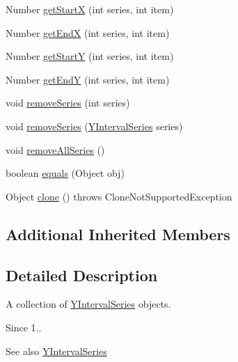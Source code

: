 \begin{DoxyCompactItemize}
\item 
Number \mbox{\hyperlink{classorg_1_1jfree_1_1data_1_1xy_1_1_y_interval_series_collection_a9675b5f0ee4eb7b9e0478844d2df61d0}{get\+StartX}} (int series, int item)
\item 
Number \mbox{\hyperlink{classorg_1_1jfree_1_1data_1_1xy_1_1_y_interval_series_collection_a5eed5a5a74285ab346d7bf3e19d31d58}{get\+EndX}} (int series, int item)
\item 
Number \mbox{\hyperlink{classorg_1_1jfree_1_1data_1_1xy_1_1_y_interval_series_collection_af499ea43862281841b964053bc9950dc}{get\+StartY}} (int series, int item)
\item 
Number \mbox{\hyperlink{classorg_1_1jfree_1_1data_1_1xy_1_1_y_interval_series_collection_a93694e5bea9406c2ac871815d6a3c038}{get\+EndY}} (int series, int item)
\item 
void \mbox{\hyperlink{classorg_1_1jfree_1_1data_1_1xy_1_1_y_interval_series_collection_a525b80ffdaf045bb55f6ef2ecbf8447c}{remove\+Series}} (int series)
\item 
void \mbox{\hyperlink{classorg_1_1jfree_1_1data_1_1xy_1_1_y_interval_series_collection_a3adb1606c093878d5141bd93f5658a7d}{remove\+Series}} (\mbox{\hyperlink{classorg_1_1jfree_1_1data_1_1xy_1_1_y_interval_series}{Y\+Interval\+Series}} series)
\item 
void \mbox{\hyperlink{classorg_1_1jfree_1_1data_1_1xy_1_1_y_interval_series_collection_a5c365080f096a9672c0c212e7310fd55}{remove\+All\+Series}} ()
\item 
boolean \mbox{\hyperlink{classorg_1_1jfree_1_1data_1_1xy_1_1_y_interval_series_collection_a22ddec9c72d3546f9b84e9b16068af8b}{equals}} (Object obj)
\item 
Object \mbox{\hyperlink{classorg_1_1jfree_1_1data_1_1xy_1_1_y_interval_series_collection_a27e024439abf77df545317b718f80217}{clone}} ()  throws Clone\+Not\+Supported\+Exception 
\end{DoxyCompactItemize}
\subsection*{Additional Inherited Members}


\subsection{Detailed Description}
A collection of \mbox{\hyperlink{classorg_1_1jfree_1_1data_1_1xy_1_1_y_interval_series}{Y\+Interval\+Series}} objects.

\begin{DoxySince}{Since}
1..
\end{DoxySince}
\begin{DoxySeeAlso}{See also}
\mbox{\hyperlink{classorg_1_1jfree_1_1data_1_1xy_1_1_y_interval_series}{Y\+Interval\+Series}} 
\end{DoxySeeAlso}


